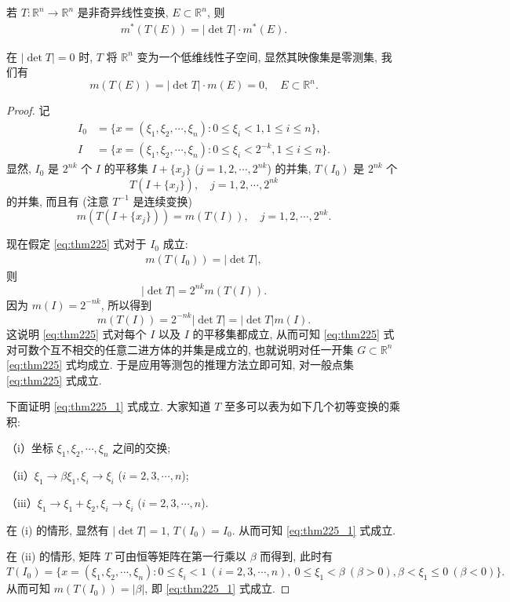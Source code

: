 \documentclass[../../main.tex]{subfiles}
\begin{document}
\begin{theorem}\label{theorem:集合的线性变换的像的外测度}
若 $T:\mathbb{R}^n\to\mathbb{R}^n$ 是非奇异线性变换, $E\subset\mathbb{R}^n$, 则
\begin{align}
m^*(T(E)) = |\det T|\cdot m^*(E).\label{eq:thm225}
\end{align}
\end{theorem}
\begin{remark}
在 $|\det T| = 0$ 时, $T$ 将 $\mathbb{R}^n$ 变为一个低维线性子空间, 显然其映像集是零测集, 我们有
\[
m(T(E)) = |\det T|\cdot m(E) = 0,\quad E\subset\mathbb{R}^n.
\] 
\end{remark}
\begin{proof}
记
\begin{align*}
I_0 &= \{x = (\xi_1,\xi_2,\cdots,\xi_n): 0\leqslant\xi_i < 1, 1\leqslant i\leqslant n\},\\
I &= \{x = (\xi_1,\xi_2,\cdots,\xi_n): 0\leqslant\xi_i < 2^{-k}, 1\leqslant i\leqslant n\}.
\end{align*}
显然, $I_0$ 是 $2^{nk}$ 个 $I$ 的平移集 $I + \{x_j\}$ ($j = 1,2,\cdots,2^{nk}$) 的并集, $T(I_0)$ 是 $2^{nk}$ 个
\[
T(I + \{x_j\}),\quad j = 1,2,\cdots,2^{nk}
\]
的并集, 而且有 (注意 $T^{-1}$ 是连续变换)
\[
m(T(I + \{x_j\})) = m(T(I)),\quad j = 1,2,\cdots,2^{nk}.
\]

现在假定 \eqref{eq:thm225} 式对于 $I_0$ 成立:
\begin{align}
m(T(I_0)) = |\det T|,\label{eq:thm225_1}
\end{align}
则
\[
|\det T| = 2^{nk}m(T(I)).
\]
因为 $m(I)=2^{-nk}$, 所以得到
\[
m(T(I)) = 2^{-nk}|\det T| = |\det T|m(I).
\]
这说明 \eqref{eq:thm225} 式对每个 $I$ 以及 $I$ 的平移集都成立, 从而可知 \eqref{eq:thm225} 式对可数个互不相交的任意二进方体的并集是成立的, 也就说明对任一开集 $G\subset\mathbb{R}^n$ \eqref{eq:thm225} 式均成立. 于是应用等测包的推理方法立即可知, 对一般点集 \eqref{eq:thm225} 式成立.

下面证明 \eqref{eq:thm225_1} 式成立. 大家知道 $T$ 至多可以表为如下几个初等变换的乘积:

（i）坐标 $\xi_1,\xi_2,\cdots,\xi_n$ 之间的交换;

（ii）$\xi_1\to\beta\xi_1,\xi_i\to\xi_i$ ($i = 2,3,\cdots,n$);

（iii）$\xi_1\to\xi_1 + \xi_2,\xi_i\to\xi_i$ ($i = 2,3,\cdots,n$).

在 (i) 的情形, 显然有 $|\det T| = 1$, $T(I_0)=I_0$. 从而可知 \eqref{eq:thm225_1} 式成立.

在 (ii) 的情形, 矩阵 $T$ 可由恒等矩阵在第一行乘以 $\beta$ 而得到, 此时有
\[
T(I_0) = \{x = (\xi_1,\xi_2,\cdots,\xi_n): 0\leqslant\xi_i < 1\ (i = 2,3,\cdots,n),\ 0\leqslant\xi_1 < \beta\ (\beta > 0), \beta < \xi_1\leqslant 0\ (\beta < 0)\}.
\]
从而可知 $m(T(I_0)) = |\beta|$, 即 \eqref{eq:thm225_1} 式成立.


\end{proof}
\end{document}
